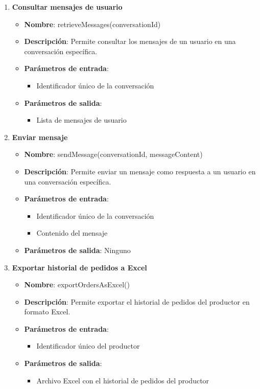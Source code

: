 \begin{enumerate}[label=SOP-\protect\twodigits{\arabic*}:, align=left, leftmargin=*]
\item \textbf{Consultar mensajes de usuario}
\begin{itemize}
\item \textbf{Nombre}: retrieveMessages(conversationId)
\item \textbf{Descripción}: Permite consultar los mensajes de un usuario en una conversación específica.
\item \textbf{Parámetros de entrada}:
\begin{itemize}
\item Identificador único de la conversación
\end{itemize}
\item \textbf{Parámetros de salida}:
\begin{itemize}
\item Lista de mensajes de usuario
\end{itemize}
\end{itemize}

\item \textbf{Enviar mensaje}
\begin{itemize}
\item \textbf{Nombre}: sendMessage(conversationId, messageContent)
\item \textbf{Descripción}: Permite enviar un mensaje como respuesta a un usuario en una conversación específica.
\item \textbf{Parámetros de entrada}:
\begin{itemize}
\item Identificador único de la conversación
\item Contenido del mensaje
\end{itemize}
\item \textbf{Parámetros de salida}: Ninguno
\end{itemize}

\item \textbf{Exportar historial de pedidos a Excel}
\begin{itemize}
\item \textbf{Nombre}: exportOrdersAsExcel()
\item \textbf{Descripción}: Permite exportar el historial de pedidos del productor en formato Excel.
\item \textbf{Parámetros de entrada}:
\begin{itemize}
\item Identificador único del productor
\end{itemize}
\item \textbf{Parámetros de salida}:
\begin{itemize}
\item Archivo Excel con el historial de pedidos del productor
\end{itemize}
\end{itemize}

\end{enumerate}
